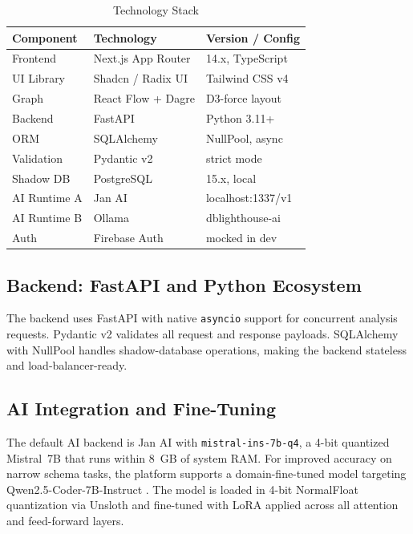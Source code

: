 \documentclass[12pt,a4paper]{report}
\begin{document}
\begin{table}[htbp]
\caption{Technology Stack}
\label{tab:stack}
\centering
\begin{tabular}{lll}
\toprule
\textbf{Component} & \textbf{Technology} & \textbf{Version / Config} \\
\midrule
Frontend    & Next.js App Router & 14.x, TypeScript \\
UI Library  & Shadcn / Radix UI  & Tailwind CSS v4 \\
Graph       & React Flow + Dagre & D3-force layout \\
Backend     & FastAPI            & Python 3.11+ \\
ORM         & SQLAlchemy         & NullPool, async \\
Validation  & Pydantic v2        & strict mode \\
Shadow DB   & PostgreSQL         & 15.x, local \\
AI Runtime A & Jan AI            & localhost:1337/v1 \\
AI Runtime B & Ollama            & dblighthouse-ai \\
Auth        & Firebase Auth      & mocked in dev \\
\bottomrule
\end{tabular}
\end{table}

\subsection{Backend: FastAPI and Python Ecosystem}

The backend uses FastAPI with native \texttt{asyncio} support for concurrent analysis requests. Pydantic v2 validates all request and response payloads. SQLAlchemy with NullPool handles shadow-database operations, making the backend stateless and load-balancer-ready.

\subsection{AI Integration and Fine-Tuning}

The default AI backend is Jan AI with \texttt{mistral-ins-7b-q4}, a 4-bit quantized Mistral~7B \cite{jiang2023mistral} that runs within 8~GB of system RAM. For improved accuracy on narrow schema tasks, the platform supports a domain-fine-tuned model targeting Qwen2.5-Coder-7B-Instruct \cite{qwen2024}. The model is loaded in 4-bit NormalFloat quantization via Unsloth \cite{han2024unsloth} and fine-tuned with LoRA \cite{hu2022lora} applied across all attention and feed-forward layers.
\end{document}
